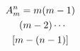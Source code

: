 \documentclass{book}
\begin{document}
\setcounter{chapter}{2}

\multlinegap=0pt
\begin{multline}
A^{n}_{m}=m(m-1)\\\shoveright{(m-2)\cdots}\\
[m-(n-1)]
\end{multline}
\end{document}
